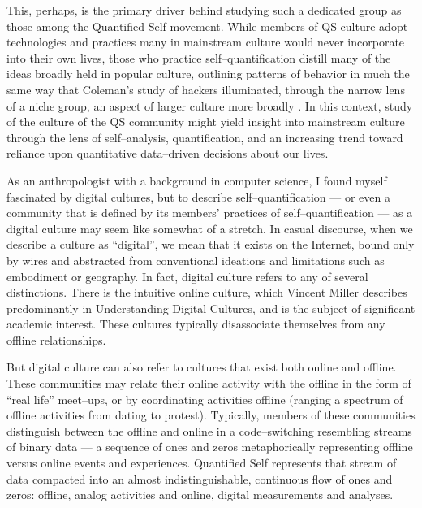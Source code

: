 \documentclass{article}
\begin{document}
This,
perhaps,
is the primary driver behind studying such a dedicated group as those among the Quantified Self movement.
While members of QS culture adopt technologies and practices many in mainstream culture would never incorporate into their own lives,
those who practice self--quantification distill many of the ideas broadly held in popular culture,
outlining patterns of behavior in much the same way that Coleman's study of hackers illuminated,
through the narrow lens of a niche group,
an aspect of larger culture more broadly
\citep{coleman2013coding}.
In this context,
study of the culture of the QS community might yield insight into mainstream culture through the lens of self--analysis,
quantification,
and an increasing trend toward reliance upon quantitative data--driven decisions about our lives.

As an anthropologist with a background in computer science,
I found myself fascinated by digital cultures,
but to describe self--quantification
--- or even a community that is defined by its members' practices of self--quantification ---
as a digital culture may seem like somewhat of a stretch.
In casual discourse,
when we describe a culture as ``digital'',
we mean that it exists on the Internet,
bound only by wires and abstracted from conventional ideations and limitations such as embodiment or geography.
In fact,
digital culture refers to any of several distinctions.
There is the intuitive online culture,
which Vincent Miller describes predominantly in Understanding Digital Cultures,
and is the subject of significant academic interest.
These cultures typically disassociate themselves from any offline relationships.

But digital culture can also refer to cultures that exist both online and offline.
These communities may relate their online activity with the offline in the form of ``real life'' meet--ups,
or by coordinating activities offline
(ranging a spectrum of offline activities from dating to protest). %
Typically,
members of these communities distinguish between the offline and online in a code--switching resembling streams of binary data
--- a sequence of ones and zeros metaphorically representing offline versus online events and experiences.
Quantified Self represents that stream of data compacted into an almost indistinguishable,
continuous flow of ones and zeros:
offline,
analog activities and online,
digital measurements and analyses.
\end{document}
